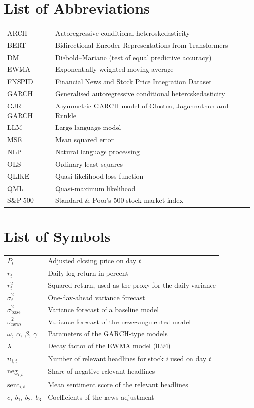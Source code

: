 \documentclass[12pt,a4paper]{article}
\begin{document}
\section*{List of Abbreviations}
\begin{tabular}{@{}p{3.2cm}p{11cm}@{}}
ARCH & Autoregressive conditional heteroskedasticity \\
BERT & Bidirectional Encoder Representations from Transformers \\
DM & Diebold--Mariano (test of equal predictive accuracy) \\
EWMA & Exponentially weighted moving average \\
FNSPID & Financial News and Stock Price Integration Dataset \\
GARCH & Generalised autoregressive conditional heteroskedasticity \\
GJR-GARCH & Asymmetric GARCH model of Glosten, Jagannathan and Runkle \\
LLM & Large language model \\
MSE & Mean squared error \\
NLP & Natural language processing \\
OLS & Ordinary least squares \\
QLIKE & Quasi-likelihood loss function \\
QML & Quasi-maximum likelihood \\
S\&P 500 & Standard \& Poor's 500 stock market index \\
\end{tabular}

\section*{List of Symbols}
\begin{tabular}{@{}p{3.2cm}p{11cm}@{}}
$P_t$ & Adjusted closing price on day $t$ \\
$r_t$ & Daily log return in percent \\
$r_t^2$ & Squared return, used as the proxy for the daily variance \\
$\hat\sigma^2_{t}$ & One-day-ahead variance forecast \\
$\hat\sigma^2_{\text{base}}$ & Variance forecast of a baseline model \\
$\hat\sigma^2_{\text{news}}$ & Variance forecast of the news-augmented model \\
$\omega,\ \alpha,\ \beta,\ \gamma$ & Parameters of the GARCH-type models \\
$\lambda$ & Decay factor of the EWMA model (0.94) \\
$n_{i,t}$ & Number of relevant headlines for stock $i$ used on day $t$ \\
$\text{neg}_{i,t}$ & Share of negative relevant headlines \\
$\text{sent}_{i,t}$ & Mean sentiment score of the relevant headlines \\
$c,\ b_1,\ b_2,\ b_3$ & Coefficients of the news adjustment \\
\end{tabular}
\clearpage
{}
\end{document}
